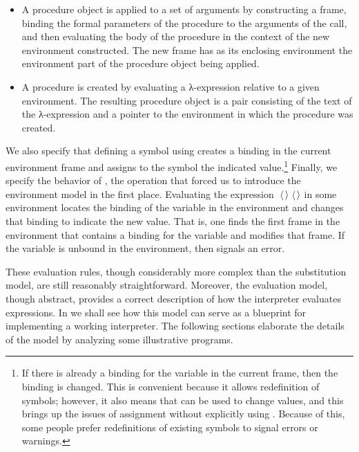 \begin{itemize}

\item
A procedure object is applied to a set of arguments by constructing a frame,
binding the formal parameters of the procedure to the arguments of the call,
and then evaluating the body of the procedure in the context of the new
environment constructed.  The new frame has as its enclosing environment the
environment part of the procedure object being applied.

\item
A procedure is created by evaluating a λ-expression relative to a
given environment.  The resulting procedure object is a pair consisting of the
text of the λ-expression and a pointer to the environment in which
the procedure was created.

\end{itemize}

\noindent
We also specify that defining a symbol using  creates a binding in
the current environment frame and assigns to the symbol the indicated
value.\footnote{If there is already a binding for the variable in the current
frame, then the binding is changed.  This is convenient because it allows
redefinition of symbols; however, it also means that  can be used
to change values, and this brings up the issues of assignment without
explicitly using .  Because of this, some people prefer
redefinitions of existing symbols to signal errors or warnings.} Finally, we
specify the behavior of , the operation that forced us to introduce
the environment model in the first place.  Evaluating the expression
\( \;\langle \)\( \kern0.08em\rangle \)\( \;\langle \)\( \kern0.08em\rangle \)\code{)} in some environment locates the
binding of the variable in the environment and changes that binding to indicate
the new value.  That is, one finds the first frame in the environment that
contains a binding for the variable and modifies that frame.  If the variable
is unbound in the environment, then  signals an error.

These evaluation rules, though considerably more complex than the substitution
model, are still reasonably straightforward.  Moreover, the evaluation model,
though abstract, provides a correct description of how the interpreter
evaluates expressions.  In  we shall see how this model can
serve as a blueprint for implementing a working interpreter.  The following
sections elaborate the details of the model by analyzing some illustrative
programs.

